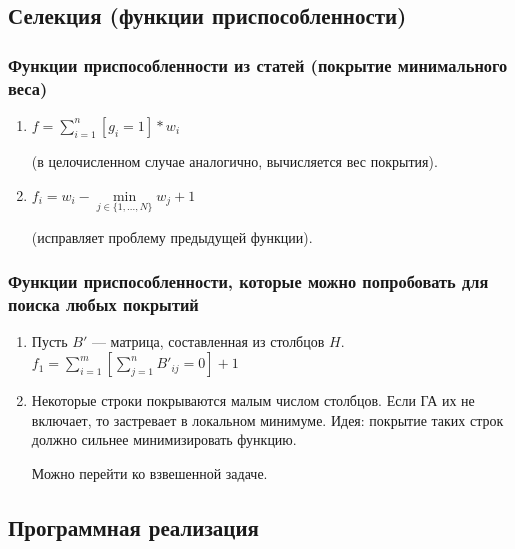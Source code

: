\documentclass[
	11pt,
]{beamer}
\begin{document}
\subsection{Селекция (функции приспособленности)}

\begin{frame}
	\frametitle{Функции приспособленности из статей (покрытие минимального веса)}
	\begin{enumerate}
		\item $f = \sum\limits_{i=1}^n[g_i = 1] * w_i$
		
		(в целочисленном случае аналогично, вычисляется вес покрытия).

		\item $f_i = w_i - \min\limits_{j \in \{1, ..., N\}} w_j + 1$
		
		(исправляет проблему предыдущей функции).
	\end{enumerate}
\end{frame}

\begin{frame}
	\frametitle{Функции приспособленности, которые можно попробовать для поиска любых покрытий}
	\begin{enumerate}
		\item Пусть $B'$ — матрица, составленная из столбцов $H$.
			  $f_1 = \sum\limits_{i=1}^m[\sum\limits_{j=1}^n B'_{ij} = 0] + 1$
		\item Некоторые строки покрываются малым числом столбцов. Если ГА их не включает, то застревает в локальном минимуме. Идея: покрытие таких строк должно сильнее минимизировать функцию.

			  Можно перейти ко взвешенной задаче.
	\end{enumerate}
\end{frame}

\subsection{Программная реализация}
\end{document}
